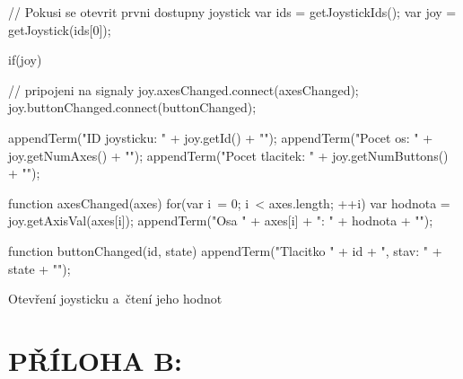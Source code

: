 \documentclass[12pt, a4paper, oneside]{article}
\begin{document}
\begin{listing}[H]
\begin{jscode}
// Pokusi se otevrit prvni dostupny joystick
var ids = getJoystickIds();
var joy = getJoystick(ids[0]);

if(joy) {
    // pripojeni na signaly
    joy.axesChanged.connect(axesChanged);
    joy.buttonChanged.connect(buttonChanged);

    appendTerm("ID joysticku: " + joy.getId() + "\n");
    appendTerm("Pocet os: " + joy.getNumAxes() + "\n");
    appendTerm("Pocet tlacitek: " +
            joy.getNumButtons() + "\n");
}

function axesChanged(axes) {
    for(var i~= 0; i~< axes.length; ++i) {
        var hodnota = joy.getAxisVal(axes[i]);
        appendTerm("Osa " + axes[i] + ": " + hodnota + "\n");
    }
}

function buttonChanged(id, state) {
    appendTerm("Tlacitko " + id + ", stav: " + state + "\n");
}
\end{jscode}
\caption{Otevření joysticku a~čtení jeho hodnot}
\end{listing}

\newpage
\section*{PŘÍLOHA B:}
\end{document}
